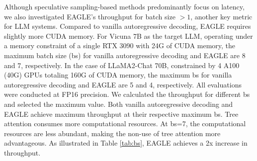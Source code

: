 \documentclass{article}
\theoremstyle{plain}
\theoremstyle{definition}
\theoremstyle{remark}
\begin{document}
Although speculative sampling-based methods predominantly focus on latency, we also investigated EAGLE's throughput for batch size $>1$, another key metric for LLM systems. Compared to vanilla autoregressive decoding, EAGLE requires slightly more CUDA memory. For Vicuna 7B as the target LLM, operating under a memory constraint of a single RTX 3090 with 24G of CUDA memory, the maximum batch size (bs) for vanilla autoregressive decoding and EAGLE are 8 and 7, respectively. In the case of LLaMA2-Chat 70B, constrained by 4 A100 (40G) GPUs totaling 160G of CUDA memory, the maximum bs for vanilla autoregressive decoding and EAGLE are 5 and 4, respectively. All evaluations were conducted at FP16 precision. We calculated the throughput for different bs and selected the maximum value. Both vanilla autoregressive decoding and EAGLE achieve maximum throughput at their respective maximum bs. Tree attention consumes more computational resources. At bs=7, the computational resources are less abundant, making the non-use of tree attention more advantageous. As illustrated in Table \ref{tab:bs}, EAGLE achieves a 2x increase in throughput.

\begin{table}
  \centering
  \caption{Speedup ratios at different batch sizes and throughput of EAGLE. The evaluation dataset is MT-bench, with the temperature parameter set to 0.}
  \label{tab:bs}%
\end{table}%





\end{document}
